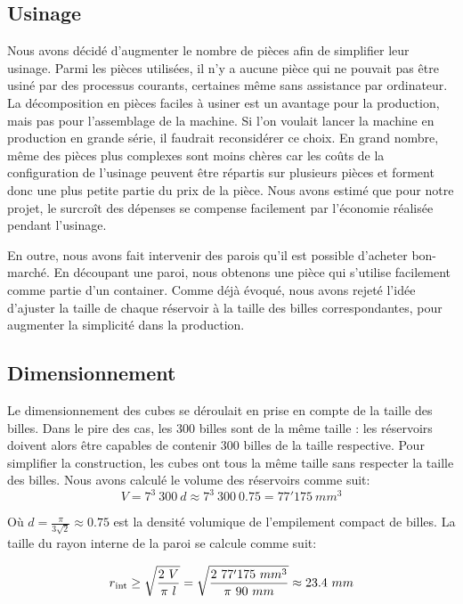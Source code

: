\subsection{Usinage}
Nous avons décidé d'augmenter le nombre de pièces afin de simplifier leur usinage. Parmi les pièces utilisées, il n'y a aucune pièce qui ne pouvait pas être usiné par des processus courants, certaines même sans assistance par ordinateur. La décomposition en pièces faciles à usiner est un avantage pour la production, mais pas pour l'assemblage de la machine. Si l'on voulait lancer la machine en production en grande série, il faudrait reconsidérer ce choix. En grand nombre, même des pièces plus complexes sont moins chères car les coûts de la configuration de l'usinage peuvent être répartis sur plusieurs pièces et forment donc une plus petite partie du prix de la pièce. Nous avons estimé que pour notre projet, le surcroît des dépenses se compense facilement par l'économie réalisée pendant l'usinage.

En outre, nous avons fait intervenir des parois qu'il est possible d'acheter bon-marché. En découpant une paroi, nous obtenons une pièce qui s'utilise facilement comme partie d'un container. Comme déjà évoqué, nous avons rejeté l'idée d'ajuster la taille de chaque réservoir à la taille des billes correspondantes, pour augmenter la simplicité dans la production. 

\subsection{Dimensionnement}
Le dimensionnement des cubes se déroulait en prise en compte de la taille des billes. Dans le pire des cas, les 300 billes sont de la même taille : les réservoirs doivent alors être capables de contenir 300 billes de la taille respective. Pour simplifier la construction, les cubes ont tous la même taille sans respecter la taille des billes.
Nous avons calculé le volume des réservoirs comme suit:
\begin{equation}
    V = 7^3\ 300\ d \approx 7^3\ 300\ 0.75 = 77'175\ mm^3
    \label{eq:volumereservoirfin}
\end{equation}

Où \(d = \frac{ \pi }{3\sqrt{2}} \approx 0.75\) est la densité volumique de l'empilement compact de billes.
La taille du rayon interne de la paroi se calcule comme suit:

\begin{equation}r\textsubscript{int}\geq\sqrt{\frac{2\ V}{\pi\ l}}=\sqrt{\frac{2\ 77'175\ mm^3}{\pi\ 90\ mm}} \approx 23.4\ mm \label{eq:rayonreservoirfin}\end{equation}

